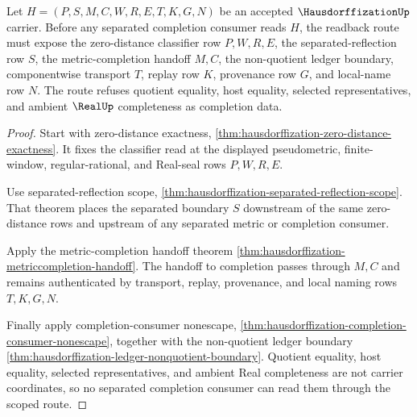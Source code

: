 \begin{theorem}
\label{thm:hausdorffization-scoped-completion-readback}
Let $H=(P,S,M,C,W,R,E,T,K,G,N)$ be an accepted $\HausdorffizationUp$ carrier. Before any separated completion consumer reads $H$, the readback route must expose the zero-distance classifier row $P,W,R,E$, the separated-reflection row $S$, the metric-completion handoff $M,C$, the non-quotient ledger boundary, componentwise transport $T$, replay row $K$, provenance row $G$, and local-name row $N$. The route refuses quotient equality, host equality, selected representatives, and ambient $\RealUp$ completeness as completion data.
\end{theorem}
\begin{proof}
Start with zero-distance exactness, \autoref{thm:hausdorffization-zero-distance-exactness}. It fixes the classifier read at the displayed pseudometric, finite-window, regular-rational, and Real-seal rows $P,W,R,E$.

Use separated-reflection scope, \autoref{thm:hausdorffization-separated-reflection-scope}. That theorem places the separated boundary $S$ downstream of the same zero-distance rows and upstream of any separated metric or completion consumer.

Apply the metric-completion handoff theorem \autoref{thm:hausdorffization-metriccompletion-handoff}. The handoff to completion passes through $M,C$ and remains authenticated by transport, replay, provenance, and local naming rows $T,K,G,N$.

Finally apply completion-consumer nonescape, \autoref{thm:hausdorffization-completion-consumer-nonescape}, together with the non-quotient ledger boundary \autoref{thm:hausdorffization-ledger-nonquotient-boundary}. Quotient equality, host equality, selected representatives, and ambient Real completeness are not carrier coordinates, so no separated completion consumer can read them through the scoped route.
\end{proof}

